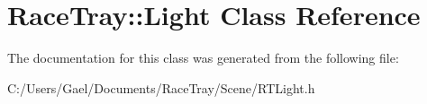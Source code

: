 \hypertarget{class_race_tray_1_1_light}{\section{Race\-Tray\-:\-:Light Class Reference}
\label{class_race_tray_1_1_light}
}


The documentation for this class was generated from the following file\-:\begin{DoxyCompactItemize}
\item 
C\-:/\-Users/\-Gael/\-Documents/\-Race\-Tray/\-Scene/R\-T\-Light.\-h\end{DoxyCompactItemize}
